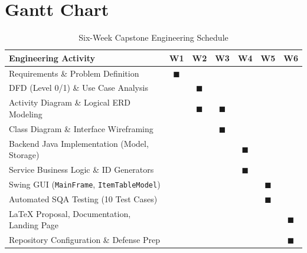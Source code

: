 \documentclass[11pt,a4paper]{article}
\begin{document}
\section{Gantt Chart}
\begin{table}[H]
    \centering
    \caption{Six-Week Capstone Engineering Schedule}
    \begin{tabularx}{\textwidth}{lcccccc}
        \toprule
        \textbf{Engineering Activity} & \textbf{W1} & \textbf{W2} & \textbf{W3} & \textbf{W4} & \textbf{W5} & \textbf{W6} \\
        \midrule
        Requirements \& Problem Definition & $\blacksquare$ & & & & & \\
        DFD (Level 0/1) \& Use Case Analysis & & $\blacksquare$ & & & & \\
        Activity Diagram \& Logical ERD Modeling & & $\blacksquare$ & $\blacksquare$ & & & \\
        Class Diagram \& Interface Wireframing & & & $\blacksquare$ & & & \\
        Backend Java Implementation (Model, Storage) & & & & $\blacksquare$ & & \\
        Service Business Logic \& ID Generators & & & & $\blacksquare$ & & \\
        Swing GUI (\texttt{MainFrame}, \texttt{ItemTableModel}) & & & & & $\blacksquare$ & \\
        Automated SQA Testing (10 Test Cases) & & & & & $\blacksquare$ & \\
        LaTeX Proposal, Documentation, Landing Page & & & & & & $\blacksquare$ \\
        Repository Configuration \& Defense Prep & & & & & & $\blacksquare$ \\
        \bottomrule
    \end{tabularx}
\end{table}

\end{document}
